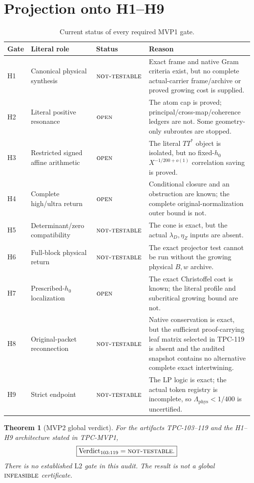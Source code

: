\documentclass[11pt,a4paper]{article}
\newtheorem{theorem}{Theorem}[section]
\theoremstyle{definition}
\theoremstyle{remark}
\newcommand{\Ltwo}{\mathrm{L2}}
\newcommand{\Lam}{\Lambda_{\mathrm{phys}}}
\newcommand{\INF}{\textnormal{\textsc{infeasible}}}
\newcommand{\NT}{\textnormal{\textsc{not-testable}}}
\newcommand{\OPEN}{\textnormal{\textsc{open}}}
\begin{document}
\section{Projection onto H1--H9}

\begin{table}[htbp]
\centering
\caption{Current status of every required MVP1 gate.}
\label{tab:gates}
\small
\begin{tabularx}{\textwidth}{@{}p{}p{}
 p{}Y@{}}
\toprule
Gate & Literal role & Status & Reason\\
\midrule
H1 & Canonical physical synthesis & \(\NT\) & Exact frame and native
Gram criteria exist, but no complete actual-carrier frame/archive or
proved growing cost is supplied.\\
H2 & Literal positive resonance & \(\OPEN\) & The atom cap is proved;
principal/cross-map/coherence ledgers are not.  Some geometry-only
subroutes are stopped.\\
H3 & Restricted signed affine arithmetic & \(\OPEN\) & The literal
\(TT^*\) object is isolated, but no fixed-\(h_0\)
\(X^{-1/200+o(1)}\) correlation saving is proved.\\
H4 & Complete high/ultra return & \(\OPEN\) & Conditional closure and
an obstruction are known; the complete original-normalization outer
bound is not.\\
H5 & Determinant/zero compatibility & \(\NT\) & The cone is exact,
but the actual \(\lambda_D,\eta_Z\) inputs are absent.\\
H6 & Full-block physical return & \(\NT\) & The exact projector test
cannot be run without the growing physical \(B,w\) archive.\\
H7 & Prescribed-\(h_0\) localization & \(\OPEN\) & The exact
Christoffel cost is known; the literal profile and subcritical
growing bound are not.\\
H8 & Original-packet reconnection & \(\NT\) & Native conservation is
exact, but the sufficient proof-carrying leaf matrix selected in
TPC-119 is absent and the audited snapshot contains no alternative
complete exact intertwining.\\
H9 & Strict endpoint & \(\NT\) & The LP logic is exact; the actual
token registry is incomplete, so \(\Lam<1/400\) is uncertified.\\
\bottomrule
\end{tabularx}
\end{table}

\begin{theorem}[MVP2 global verdict]
\label{thm:verdict}
For the artifacts TPC-103--119 and the H1--H9 architecture stated in
TPC-MVP1,
\[
 \boxed{\operatorname{Verdict}_{103:119}=\NT.}
\]
There is no established \(\Ltwo\) gate in this audit.  The result is
not a global \(\INF\) certificate.
\end{theorem}
\end{document}
